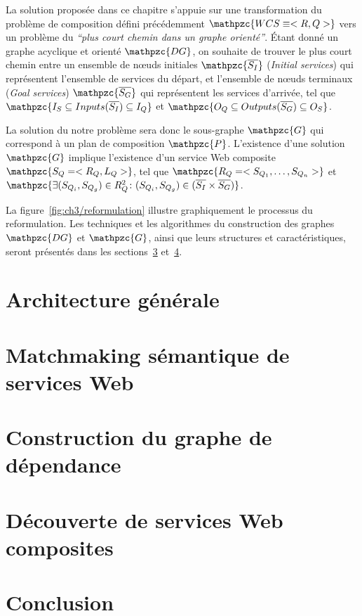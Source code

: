 La solution proposée dans ce chapitre s'appuie sur une transformation
du problème de composition défini précédemment
$\mathpzc{WCS \equiv <R,Q>}$ vers un problème du \textit{``plus court
  chemin dans un graphe orienté''}. Étant donné un graphe acyclique et
orienté $\mathpzc{DG}$, on souhaite de trouver le plus court chemin
entre un ensemble de nœuds initiales $\mathpzc{\overline{S_I}}$
(\emph{Initial services}) qui représentent l'ensemble de services du
départ, et l'ensemble de nœuds terminaux (\emph{Goal services})
$\mathpzc{\overline{S_G}}$ qui représentent les services d'arrivée,
tel que $\mathpzc{I_S \subseteq Inputs(\overline{S_I}) \subseteq I_Q}$
et
$\mathpzc{O_Q \subseteq Outputs(\overline{S_G}) \subseteq
  O_S}$.\medskip

La solution du notre problème sera donc le sous-graphe $\mathpzc{G}$
qui correspond à un plan de composition $\mathpzc{P}$. L'existence
d'une solution $\mathpzc{G}$ implique l'existence d'un service Web
composite $\mathpzc{S_Q= <R_Q, L_Q>}$, tel que
$\mathpzc{R_Q= <S_{Q_1}, \dots, S_{Q_n}>}$ et
$\mathpzc{\exists (S_{Q_i},S_{Q_g}) \in R_Q^2 \colon (S_{Q_i},S_{Q_g})
  \in (\overline{S_I} \times \overline{S_G})}$.\medskip

La figure~\ref{fig:ch3/reformulation} illustre graphiquement le
processus du reformulation. Les techniques et les algorithmes du
construction des graphes $\mathpzc{DG}$ et $\mathpzc{G}$, ainsi que
leurs structures et caractéristiques, seront présentés dans les
sections~\ref{sec:ch3/dependency-graph}
et~\ref{sec:ch3/composite-discovery}.\medskip

\section{Architecture générale}
\label{sec:ch3/proposition}

\section{Matchmaking sémantique de services Web}
\label{sec:ch3/semantic-matching}


\section{Construction du graphe de dépendance}
\label{sec:ch3/dependency-graph}

\section{Découverte de services Web composites}
\label{sec:ch3/composite-discovery}
\section*{Conclusion}
\label{sec:ch3/conclusion}
 


